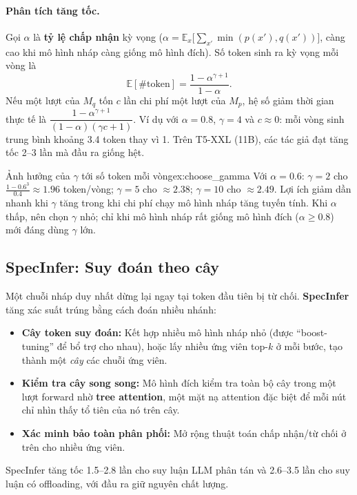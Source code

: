 \paragraph{Phân tích tăng tốc.} Gọi $\alpha$ là \textbf{tỷ lệ chấp nhận} kỳ vọng ($\alpha = \mathbb{E}_x\big[\sum_{x'}\min(p(x'), q(x'))\big]$, càng cao khi mô hình nháp càng giống mô hình đích). Số token sinh ra kỳ vọng mỗi vòng là
\[
\mathbb{E}[\#\text{token}] = \frac{1 - \alpha^{\gamma+1}}{1 - \alpha}.
\]
Nếu một lượt của $M_q$ tốn $c$ lần chi phí một lượt của $M_p$, hệ số giảm thời gian thực tế là $\dfrac{1 - \alpha^{\gamma+1}}{(1-\alpha)(\gamma c + 1)}$. Ví dụ với $\alpha = 0.8$, $\gamma = 4$ và $c \approx 0$: mỗi vòng sinh trung bình khoảng 3.4 token thay vì 1. Trên T5-XXL (11B), các tác giả đạt tăng tốc 2--3 lần mà đầu ra giống hệt.

\begin{example}{Ảnh hưởng của $\gamma$ tới số token mỗi vòng}{ex:choose_gamma}
Với $\alpha = 0.6$: $\gamma = 2$ cho $\frac{1-0.6^3}{0.4} \approx 1.96$ token/vòng; $\gamma = 5$ cho $\approx 2.38$; $\gamma = 10$ cho $\approx 2.49$. Lợi ích giảm dần nhanh khi $\gamma$ tăng trong khi chi phí chạy mô hình nháp tăng tuyến tính. Khi $\alpha$ thấp, nên chọn $\gamma$ nhỏ; chỉ khi mô hình nháp rất giống mô hình đích ($\alpha \geq 0.8$) mới đáng dùng $\gamma$ lớn.
\end{example}

\subsection{SpecInfer: Suy đoán theo cây}
\label{ssec:specinfer}
Một chuỗi nháp duy nhất dừng lại ngay tại token đầu tiên bị từ chối. \textbf{SpecInfer} \cite{miao2024specinfer} tăng xác suất trúng bằng cách đoán nhiều nhánh:
\begin{itemize}
	\item \textbf{Cây token suy đoán:} Kết hợp nhiều mô hình nháp nhỏ (được “boost-tuning” để bổ trợ cho nhau), hoặc lấy nhiều ứng viên top-$k$ ở mỗi bước, tạo thành một \emph{cây} các chuỗi ứng viên.
	\item \textbf{Kiểm tra cây song song:} Mô hình đích kiểm tra toàn bộ cây trong một lượt forward nhờ \textbf{tree attention}, một mặt nạ attention đặc biệt để mỗi nút chỉ nhìn thấy tổ tiên của nó trên cây.
	\item \textbf{Xác minh bảo toàn phân phối:} Mở rộng thuật toán chấp nhận/từ chối ở trên cho nhiều ứng viên.
\end{itemize}
SpecInfer tăng tốc 1.5--2.8 lần cho suy luận LLM phân tán và 2.6--3.5 lần cho suy luận có offloading, với đầu ra giữ nguyên chất lượng.

